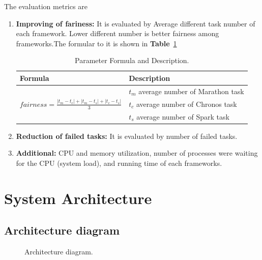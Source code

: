 \documentclass[12pt,oneside,openright,a4paper]{cpe-english-project}
\begin{document}
\hspace{10mm}The evaluation metrics are 
\begin{enumerate}
  \item \textbf{Improving of fariness:} It is evaluated by Average different task number of each framework. Lower different number is better fairness among frameworks.The formular to it is  shown in \textbf{Table}~\ref{tbl:formular}
    \begin{table}[!h]
    \caption{Parameter Formula and Description.}\label{tbl:formular}
    \begin{tabular}{@{}|p{}|p{}|}
      \hline
      \textbf{Formula} & \textbf{Description} \\ 
      \hline
      \multirow{3}{*}{$fairness = \frac{|t_m-t_c|+|t_m-t_s|+|t_c-t_s|}{3} $} & $t_m$ average number of Marathon task\\ 
      & $t_c$ average number of Chronos task\\ 
      & $t_s$ average number of Spark task\\ 
      \hline
    \end{tabular}
  \end{table}
  \item \textbf{Reduction of failed tasks:} It is evaluated by number of failed tasks.
  \item \textbf{Additional:} CPU and memory utilization, number of processes were waiting for the CPU (system load), and running time of each frameworks.
\end{enumerate}

\newpage
\section{System Architecture}

\subsection{Architecture diagram}  

\begin{figure}[!h]\centering
  \setlength{\fboxrule}{0mm} %
  \setlength{\fboxsep}{0cm}
  \caption{Architecture diagram.}\label{fig:ArchitectureDiagram}
\end{figure}
\end{document}
